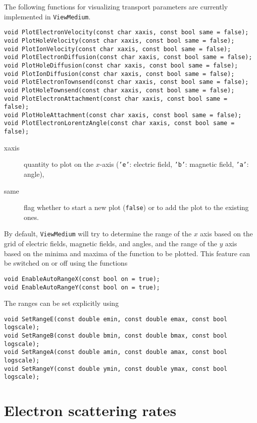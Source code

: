 The following functions for visualizing transport parameters 
are currently implemented in \texttt{ViewMedium}.
\begin{lstlisting}
void PlotElectronVelocity(const char xaxis, const bool same = false);
void PlotHoleVelocity(const char xaxis, const bool same = false);
void PlotIonVelocity(const char xaxis, const bool same = false);
void PlotElectronDiffusion(const char xaxis, const bool same = false);
void PlotHoleDiffusion(const char xaxis, const bool same = false);
void PlotIonDiffusion(const char xaxis, const bool same = false);
void PlotElectronTownsend(const char xaxis, const bool same = false);
void PlotHoleTownsend(const char xaxis, const bool same = false);
void PlotElectronAttachment(const char xaxis, const bool same = false);
void PlotHoleAttachment(const char xaxis, const bool same = false);
void PlotElectronLorentzAngle(const char xaxis, const bool same = false);
\end{lstlisting}
\begin{description}
  \item[xaxis] quantity to plot on the $x$-axis (\texttt{'e'}: electric field, 
  \texttt{'b'}: magnetic field, \texttt{'a'}: angle),
  \item[same] flag whether to start a new plot (\texttt{false}) or to add the 
plot to the existing ones.
\end{description}
By default, \texttt{ViewMedium} will try to determine the range of the 
$x$ axis based on the grid of electric fields, magnetic fields, 
and angles, and the range of the $y$ axis based on the 
minima and maxima of the function to be plotted. This feature can be 
switched on or off using the functions
\begin{lstlisting}
void EnableAutoRangeX(const bool on = true);
void EnableAutoRangeY(const bool on = true);
\end{lstlisting}
The ranges can be set explicitly using
\begin{lstlisting}
void SetRangeE(const double emin, const double emax, const bool logscale);
void SetRangeB(const double bmin, const double bmax, const bool logscale);
void SetRangeA(const double amin, const double amax, const bool logscale);
void SetRangeY(const double ymin, const double ymax, const bool logscale);
\end{lstlisting} 
\section{Electron scattering rates}

